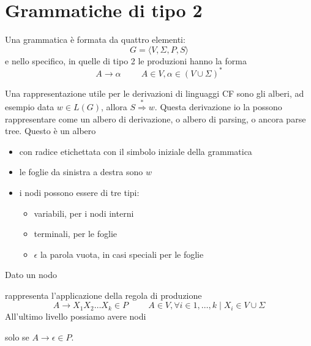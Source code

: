 \documentclass[12pt]{article}
\begin{document}
\tableofcontents
\newpage

\section{Grammatiche di tipo 2}
Una grammatica è formata da quattro elementi:
$$ G = \langle V, \Sigma, P, S \rangle $$
e nello specifico, in quelle di tipo 2 le produzioni hanno la forma
$$ A \rightarrow \alpha \hspace{1cm} A \in V, \alpha \in (V \cup \Sigma)^* $$

Una rappresentazione utile per le derivazioni di linguaggi CF sono gli alberi, ad esempio data $w \in L(G)$, allora $S \overset{*}{\Rightarrow} w$.
Questa derivazione io la possono rappresentare come un albero di derivazione, o albero di parsing, o ancora parse tree.
Questo è un albero 
\begin{itemize}
	\item con radice etichettata con il simbolo iniziale della grammatica
	\item le foglie da sinistra a destra sono $w$
	\item i nodi possono essere di tre tipi:
		\begin{itemize}
			\item variabili, per i nodi interni
			\item terminali, per le foglie
			\item $\epsilon$ la parola vuota, in casi speciali per le foglie
		\end{itemize}
\end{itemize}
Dato un nodo
\begin{center}
\end{center}
rappresenta l'applicazione della regola di produzione
$$ A \rightarrow X_1 X_2 \dots X_k \in P \hspace{1cm} A \in V, \forall i \in 1, \dots, k \mid X_i \in V \cup \Sigma $$
All'ultimo livello possiamo avere nodi
\begin{center}
\end{center}
solo se $A \rightarrow \epsilon \in P$.
\end{document}
